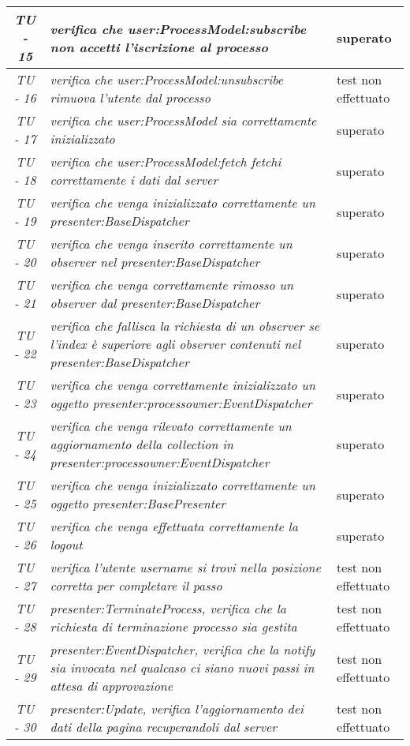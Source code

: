 \begin{small}\centering
\begin{tabular}{|c|p{8.0cm}|p{2.0cm}|}
\hline
\textit{TU - 15} &
\textit{verifica che user:ProcessModel:subscribe non accetti l'iscrizione al processo} &  superato\\
\hline
\textit{TU - 16} &
\textit{verifica che user:ProcessModel:unsubscribe rimuova l'utente dal processo} &  test non effettuato\\
\hline
\textit{TU - 17} &
\textit{verifica che user:ProcessModel sia correttamente inizializzato} & superato \\
\hline
\textit{TU - 18} &
\textit{verifica che user:ProcessModel:fetch fetchi correttamente i dati dal server } & superato \\
\hline
\textit{TU - 19} &
\textit{verifica che venga inizializzato correttamente un presenter:BaseDispatcher} & superato \\
\hline
\textit{TU - 20} &
\textit{ verifica che venga inserito correttamente un observer nel presenter:BaseDispatcher } & superato \\
\hline
\textit{TU - 21} &
\textit{ verifica che venga correttamente rimosso un observer dal presenter:BaseDispatcher} & superato \\
\hline
\textit{TU - 22} &
\textit{ verifica che fallisca la richiesta di un observer se l'index è superiore agli observer contenuti nel presenter:BaseDispatcher} & superato \\
\hline
\textit{TU - 23} &
\textit{verifica che venga correttamente inizializzato un oggetto presenter:processowner:EventDispatcher } & superato \\
\hline
\textit{TU - 24} &
\textit{verifica che venga rilevato correttamente un aggiornamento della collection in presenter:processowner:EventDispatcher} & superato \\
\hline
\textit{TU - 25} &
\textit{verifica che venga inizializzato correttamente un oggetto presenter:BasePresenter } & superato \\
\hline
\textit{TU - 26} &
\textit{verifica che venga effettuata correttamente la logout } & superato \\
\hline
\textit{TU - 27} &
\textit{verifica l'utente username si trovi nella posizione corretta per completare il passo } & test non effettuato \\
\hline
\textit{TU - 28} &
\textit{presenter:TerminateProcess, verifica che la richiesta di terminazione processo sia gestita } & test non effettuato \\
\hline
\textit{TU - 29} &
\textit{presenter:EventDispatcher, verifica che la notify sia invocata nel qualcaso ci siano nuovi passi in attesa di approvazione } & test non effettuato \\
\hline
\textit{TU - 30} &
\textit{presenter:Update, verifica l'aggiornamento dei dati della pagina recuperandoli dal server} & test non effettuato \\
\hline
\end{tabular}\\
\end{small}

